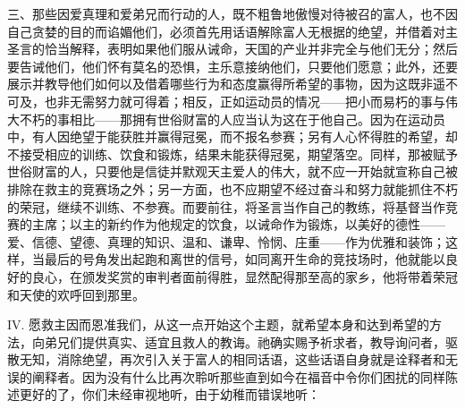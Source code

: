 三、那些因爱真理和爱弟兄而行动的人，既不粗鲁地傲慢对待被召的富人，也不因自己贪婪的目的而谄媚他们，必须首先用话语解除富人无根据的绝望，并借着对主圣言的恰当解释，表明如果他们服从诫命，天国的产业并非完全与他们无分；然后要告诫他们，他们怀有莫名的恐惧，主乐意接纳他们，只要他们愿意；此外，还要展示并教导他们如何以及借着哪些行为和态度赢得所希望的事物，因为这既非遥不可及，也非无需努力就可得着；相反，正如运动员的情况——把小而易朽的事与伟大不朽的事相比——那拥有世俗财富的人应当认为这在于他自己。因为在运动员中，有人因绝望于能获胜并赢得冠冕，而不报名参赛；另有人心怀得胜的希望，却不接受相应的训练、饮食和锻炼，结果未能获得冠冕，期望落空。同样，那被赋予世俗财富的人，只要他是信徒并默观天主爱人的伟大，就不应一开始就宣称自己被排除在救主的竞赛场之外；另一方面，也不应期望不经过奋斗和努力就能抓住不朽的荣冠，继续不训练、不参赛。而要前往，将圣言当作自己的教练，将基督当作竞赛的主席；以主的新约作为他规定的饮食，以诫命作为锻炼，以美好的德性——爱、信德、望德、真理的知识、温和、谦卑、怜悯、庄重——作为优雅和装饰；这样，当最后的号角发出起跑和离世的信号，如同离开生命的竞技场时，他就能以良好的良心，在颁发奖赏的审判者面前得胜，显然配得那至高的家乡，他将带着荣冠和天使的欢呼回到那里。\par

IV. 愿救主因而恩准我们，从这一点开始这个主题，就希望本身和达到希望的方法，向弟兄们提供真实、适宜且救人的教诲。祂确实赐予祈求者，教导询问者，驱散无知，消除绝望，再次引入关于富人的相同话语，这些话语自身就是诠释者和无误的阐释者。因为没有什么比再次聆听那些直到如今在福音中令你们困扰的同样陈述更好的了，你们未经审视地听，由于幼稚而错误地听：\par


